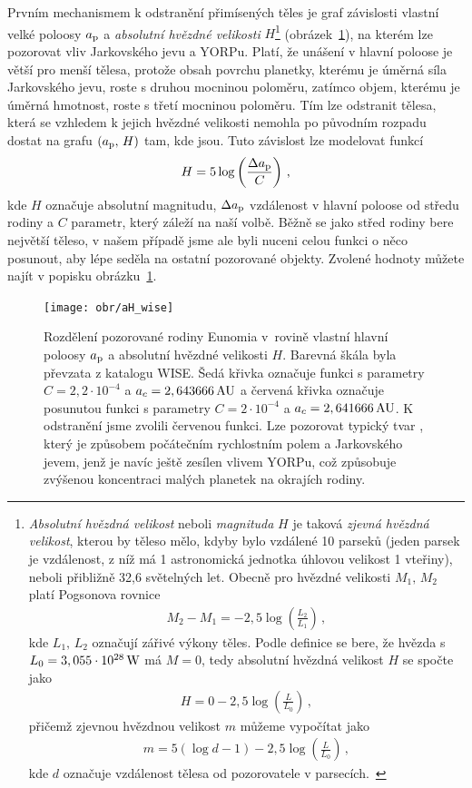 \documentclass[A4paper, 12pt, oneside]{book}
\begin{document}
Prvním mechanismem k odstranění přimísených těles je graf závislosti vlastní velké poloosy $a_{\rm p}$ a \textit{absolutní hvězdné velikosti} $H$\footnote{\textit{Absolutní hvězdná velikost} neboli \textit{magnituda} $H$ je taková \textit{zjevná hvězdná velikost}, kterou by těleso mělo, kdyby bylo vzdálené 10 parseků (jeden parsek je vzdálenost, z níž má 1 astronomická jednotka úhlovou velikost 1 vteřiny), neboli přibližně 32,6 světelných let. Obecně pro hvězdné velikosti $M_1,\,M_2$ platí Pogsonova rovnice
\begin{align*}
	M_2-M_1=-2,5\log\left(\frac{L_2}{L_1}\right)\,,
\end{align*}
kde $L_1,\,L_2$ označují zářivé výkony těles. Podle definice se bere, že hvězda s $L_0=3,055\cdot10^{28}\,{\rm W}$ má $M=0$, tedy absolutní hvězdná velikost $H$ se spočte jako
\begin{align*}
	H=0-2,5\log\left(\frac{L}{L_0}\right)\,,
\end{align*}
přičemž zjevnou hvězdnou velikost $m$ můžeme vypočítat jako
\begin{align*}
	m=5(\log d -1)-2,5\log\left(\frac{L}{L_0}\right)\,,
\end{align*}
kde $d$ označuje vzdálenost tělesa od pozorovatele v parsecích.~\cite{fmt}} 
(obrázek~\ref{fig:aH_wise}), na kterém lze pozorovat vliv Jarkovského jevu a YORPu. Platí, že unášení v hlavní poloose je větší pro menší tělesa, protože obsah povrchu planetky, kterému je úměrná síla Jarkovského jevu, roste s druhou mocninou poloměru, zatímco objem, kterému je úměrná hmotnost, roste s třetí mocninou poloměru. Tím lze odstranit tělesa, která se vzhledem k jejich hvězdné velikosti nemohla po původním rozpadu dostat na grafu $(a_{\rm p},\,H)$ tam, kde jsou. Tuto závislost lze modelovat funkcí 
\begin{align}
	H=5\log\left(\frac{\Delta a_{\rm p}}{C}\right)\,,
\end{align}
kde $H$ označuje absolutní magnitudu, $\Delta a_{\rm p}$ vzdálenost v hlavní poloose od středu rodiny a $C$ parametr, který záleží na naší volbě. Běžně se jako střed rodiny bere největší těleso, v našem případě jsme ale byli nuceni celou funkci o něco posunout, aby lépe seděla na ostatní pozorované objekty. Zvolené hodnoty můžete najít v popisku obrázku~\ref{fig:aH_wise}.
\begin{figure}
	\centering
	\texttt{[image: obr/aH\_wise]}
	\caption{Rozdělení pozorované rodiny Eunomia v~rovině vlastní hlavní poloosy $a_{\rm p}$ a absolutní hvězdné velikosti $H$. Barevná škála byla převzata z katalogu WISE. Šedá křivka označuje funkci s parametry ${C=2,2\cdot10^{-4}}$ a ${a_c=2,643666\,{\rm AU}}$ a červená křivka označuje posunutou funkci s parametry ${C=2\cdot10^{-4}}$ a ${a_c=2,641666\,{\rm AU}}$. K odstranění  jsme zvolili červenou funkci. Lze pozorovat typický tvar , který je způsobem počátečním rychlostním polem a Jarkovského jevem, jenž je navíc ještě zesílen vlivem YORPu, což způsobuje zvýšenou koncentraci malých planetek na okrajích rodiny.}
	\label{fig:aH_wise}
\end{figure}
\end{document}
